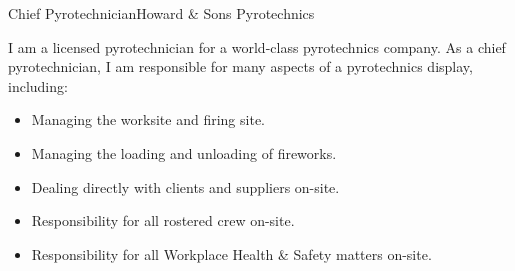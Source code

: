 \begin{professionalExperience}
{Chief Pyrotechnician}{Howard \& Sons Pyrotechnics}
{I am a licensed pyrotechnician for a world-class pyrotechnics company. As a
chief pyrotechnician, I am responsible for many aspects of a pyrotechnics
display, including:
\begin{itemize}
    \item Managing the worksite and firing site.
    \item Managing the loading and unloading of fireworks.
    \item Dealing directly with clients and suppliers on-site.
    \item Responsibility for all rostered crew on-site.
    \item Responsibility for all Workplace Health \& Safety matters on-site.
\end{itemize}}

\end{professionalExperience}
